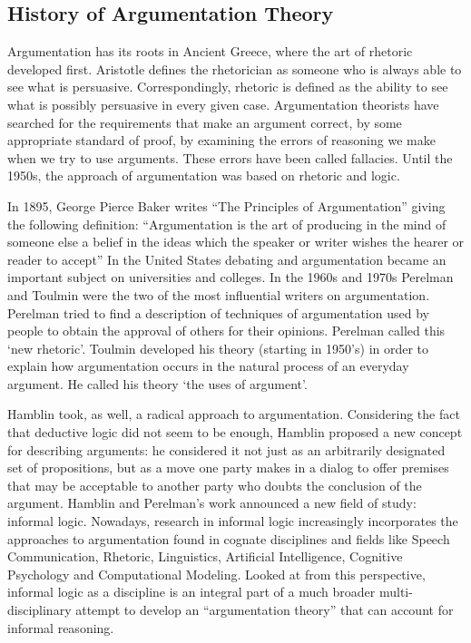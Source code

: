 \documentclass[lnbip]{svmultln}
\begin{document}
\subsection{History of Argumentation Theory}
\par
Argumentation has its roots in Ancient Greece, where the art of rhetoric developed first. Aristotle defines the rhetorician as someone who is always able to see what is persuasive. Correspondingly, rhetoric is defined as the ability to see what is possibly persuasive in every given case.  Argumentation theorists have searched for the requirements that make an argument correct, by some appropriate standard of proof, by examining the errors of reasoning we make when we try to use arguments. These errors have been called fallacies. Until the 1950s, the approach of argumentation was based on rhetoric and logic.
\par
In 1895, George Pierce Baker writes “The Principles of Argumentation” giving the following definition: ``Argumentation is the art of producing in the mind of someone else a belief in the ideas which the speaker or writer wishes the hearer or reader to accept'' 
In the United States debating and argumentation became an important subject on universities and colleges. In the 1960s and 1970s Perelman and Toulmin were the two of the most influential writers on argumentation. Perelman tried to find a description of techniques of argumentation used by people to obtain the approval of others for their opinions. Perelman called this `new rhetoric'. Toulmin developed his theory (starting in 1950’s) in order to explain how argumentation occurs in the natural process of an everyday argument. He called his theory `the uses of argument'. 
\par
Hamblin took, as well, a radical approach to argumentation. Considering the fact that deductive logic did not seem to be enough, Hamblin proposed a new concept for describing arguments: he considered it not just as an arbitrarily designated set of propositions, but as a move one party makes in a dialog to offer premises that may be acceptable to another party who doubts the conclusion of the argument.
Hamblin and Perelman’s work announced a new field of study: informal logic. Nowadays,  research in informal logic increasingly incorporates the approaches to argumentation found in cognate disciplines and fields like Speech Communication, Rhetoric, Linguistics, Artificial Intelligence, Cognitive Psychology and Computational Modeling. Looked at from this perspective, informal logic as a discipline is an integral part of a much broader multi-disciplinary attempt to develop an ``argumentation theory'' that can account for informal reasoning.
\end{document}
